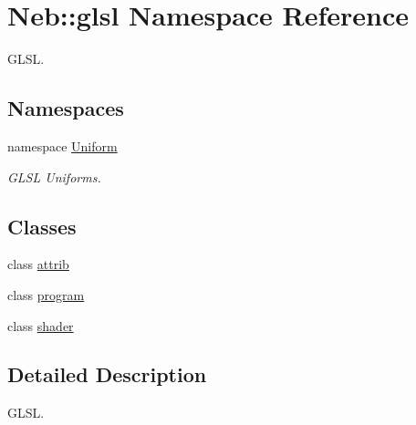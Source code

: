 \hypertarget{namespaceNeb_1_1glsl}{\section{\-Neb\-:\-:glsl \-Namespace \-Reference}
\label{namespaceNeb_1_1glsl}
}


\-G\-L\-S\-L.  


\subsection*{\-Namespaces}
\begin{DoxyCompactItemize}
\item 
namespace \hyperlink{namespaceNeb_1_1glsl_1_1Uniform}{\-Uniform}
\begin{DoxyCompactList}\small\item\em \-G\-L\-S\-L \-Uniforms. \end{DoxyCompactList}\end{DoxyCompactItemize}
\subsection*{\-Classes}
\begin{DoxyCompactItemize}
\item 
class \hyperlink{classNeb_1_1glsl_1_1attrib}{attrib}
\item 
class \hyperlink{classNeb_1_1glsl_1_1program}{program}
\item 
class \hyperlink{classNeb_1_1glsl_1_1shader}{shader}
\end{DoxyCompactItemize}


\subsection{\-Detailed \-Description}
\-G\-L\-S\-L. 